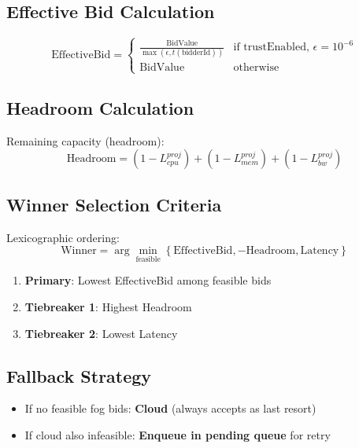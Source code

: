 \documentclass[12pt,a4paper]{article}
\begin{document}
\subsection{Effective Bid Calculation}

\begin{equation}
    \text{EffectiveBid} = \begin{cases}
        \frac{\text{BidValue}}{\max(\epsilon, t(\text{bidderId}))} & \text{if trustEnabled, } \epsilon = 10^{-6} \\
        \text{BidValue} & \text{otherwise}
    \end{cases}
\end{equation}

\subsection{Headroom Calculation}

Remaining capacity (headroom):
\begin{equation}
    \text{Headroom} = (1 - L_{cpu}^{proj}) + (1 - L_{mem}^{proj}) + (1 - L_{bw}^{proj})
\end{equation}

\subsection{Winner Selection Criteria}

Lexicographic ordering:
\begin{equation}
    \text{Winner} = \arg\min_{\text{feasible}} \left\{ \text{EffectiveBid}, -\text{Headroom}, \text{Latency} \right\}
\end{equation}

\begin{enumerate}
    \item \textbf{Primary}: Lowest EffectiveBid among feasible bids
    \item \textbf{Tiebreaker 1}: Highest Headroom
    \item \textbf{Tiebreaker 2}: Lowest Latency
\end{enumerate}

\subsection{Fallback Strategy}

\begin{itemize}
    \item If no feasible fog bids: \textbf{Cloud} (always accepts as last resort)
    \item If cloud also infeasible: \textbf{Enqueue in pending queue} for retry
\end{itemize}
\end{document}
